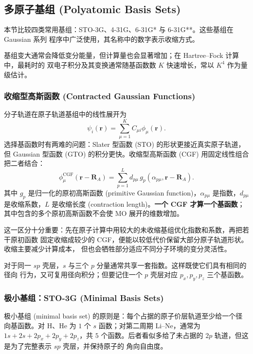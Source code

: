 \documentclass[fontset=none,12pt,a4paper]{ctexart}
\numberwithin{equation}{section}
\begin{document}
\subsection{多原子基组 (Polyatomic Basis Sets)}

本节比较四类常用基组：STO-3G、4-31G、6-31G* 与 6-31G**。这些基组在 Gaussian 系列
程序中广泛使用，其名称中的数字表示收缩方式。

基组变大通常会降低变分能量，但计算量也会显著增加；在 Hartree--Fock 计算中，最耗时的
双电子积分及其变换通常随基函数数 $K$ 快速增长，常以 $K^4$ 作为量级估计。

\subsubsection{收缩型高斯函数 (Contracted Gaussian Functions)}

分子轨道在原子轨道基组中的线性展开为
\begin{equation}
  \psi_i(\mathbf r)=\sum_{\mu=1}^{K}C_{\mu i}\phi_\mu(\mathbf r).
  \label{eq:mo-lcao-expansion}
\end{equation}
选择基函数时有两难的问题：Slater 型函数 (STO) 的形状更接近真实原子轨道，
但 Gaussian 型函数 (GTO) 的积分更快。收缩型高斯函数 (CGF) 用固定线性组合把二者结合：
\begin{equation}
  \phi_\mu^{\mathrm{CGF}}(\mathbf r-\mathbf R_A)
  =\sum_{p=1}^{L}d_{p\mu}\,
  g_p(\alpha_{p\mu},\mathbf r-\mathbf R_A).
  \label{eq:contracted-gaussian}
\end{equation}
其中 $g_p$ 是归一化的原初高斯函数 (primitive Gaussian function)，$\alpha_{p\mu}$
是指数，$d_{p\mu}$ 是收缩系数，$L$ 是收缩长度 (contraction length)。\textbf{一个 CGF
才算一个基函数}；其中包含的多个原初高斯函数不会使 MO 展开的维数增加。

这一区分十分重要：先在原子计算中用较大的未收缩基组优化指数和系数，再把若干原初函数
固定收缩成较少的 CGF，便能以较低代价保留大部分原子轨道形状。收缩主要减少计算成本，
但也会牺牲部分适应不同分子环境的变分灵活性。

对于同一 $sp$ 壳层，$s$ 与三个 $p$ 分量通常共享一套指数。这样既使它们具有相同的径向
行为，又可复用径向积分；但要记住一个 $p$ 壳层对应 $p_x,p_y,p_z$ 三个基函数。

\subsubsection{极小基组：STO-3G (Minimal Basis Sets)}

极小基组 (minimal basis set) 的原则是：每个占据的原子价层轨道至少给一个径向基函数。对
H、He 为 $1$ 个 $s$ 函数；对第二周期 Li--Ne，通常为 $1s+2s+2p_x+2p_y+2p_z$，共 $5$
个函数。后者看似多给了未占据的 $2p$ 轨道，但这是为了完整表示 $sp$ 壳层，并保持原子的
角向自由度。
\end{document}
